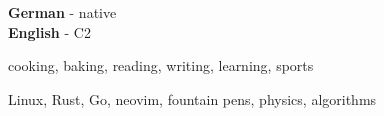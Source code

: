 \documentclass[9pt]{developercv} %
\begin{document}

\begin{minipage}[t]{0.265\textwidth}
	\vspace{-\baselineskip} %
	
	
	\textbf{German} - native\\
	\textbf{English} - C2\\
\end{minipage}
\hfill
\begin{minipage}[t]{0.3\textwidth}
	\vspace{-\baselineskip} %
	
	
	cooking, baking, reading, writing, learning, sports
\end{minipage}
\hfill
\begin{minipage}[t]{0.3\textwidth}
	\vspace{-\baselineskip} %
	
	
	Linux, Rust, Go, neovim, fountain pens, physics, algorithms
\end{minipage}

\end{document}
